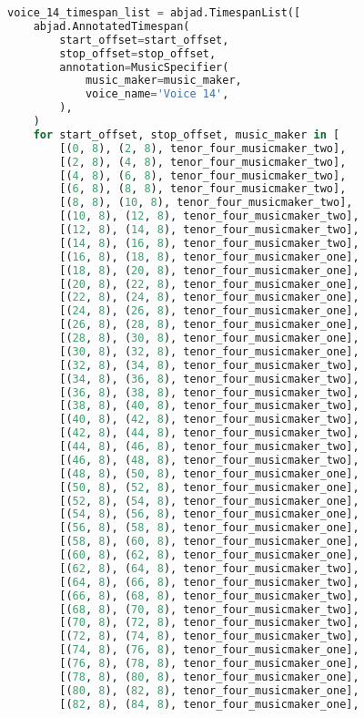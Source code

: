 \begin{lstlisting}[language=Python, caption=Invocation Source Code]
voice_14_timespan_list = abjad.TimespanList([
    abjad.AnnotatedTimespan(
        start_offset=start_offset,
        stop_offset=stop_offset,
        annotation=MusicSpecifier(
            music_maker=music_maker,
            voice_name='Voice 14',
        ),
    )
    for start_offset, stop_offset, music_maker in [
        [(0, 8), (2, 8), tenor_four_musicmaker_two],
        [(2, 8), (4, 8), tenor_four_musicmaker_two],
        [(4, 8), (6, 8), tenor_four_musicmaker_two],
        [(6, 8), (8, 8), tenor_four_musicmaker_two],
        [(8, 8), (10, 8), tenor_four_musicmaker_two],
        [(10, 8), (12, 8), tenor_four_musicmaker_two],
        [(12, 8), (14, 8), tenor_four_musicmaker_two],
        [(14, 8), (16, 8), tenor_four_musicmaker_two],
        [(16, 8), (18, 8), tenor_four_musicmaker_one],
        [(18, 8), (20, 8), tenor_four_musicmaker_one],
        [(20, 8), (22, 8), tenor_four_musicmaker_one],
        [(22, 8), (24, 8), tenor_four_musicmaker_one],
        [(24, 8), (26, 8), tenor_four_musicmaker_one],
        [(26, 8), (28, 8), tenor_four_musicmaker_one],
        [(28, 8), (30, 8), tenor_four_musicmaker_one],
        [(30, 8), (32, 8), tenor_four_musicmaker_one],
        [(32, 8), (34, 8), tenor_four_musicmaker_two],
        [(34, 8), (36, 8), tenor_four_musicmaker_two],
        [(36, 8), (38, 8), tenor_four_musicmaker_two],
        [(38, 8), (40, 8), tenor_four_musicmaker_two],
        [(40, 8), (42, 8), tenor_four_musicmaker_two],
        [(42, 8), (44, 8), tenor_four_musicmaker_two],
        [(44, 8), (46, 8), tenor_four_musicmaker_two],
        [(46, 8), (48, 8), tenor_four_musicmaker_two],
        [(48, 8), (50, 8), tenor_four_musicmaker_one],
        [(50, 8), (52, 8), tenor_four_musicmaker_one],
        [(52, 8), (54, 8), tenor_four_musicmaker_one],
        [(54, 8), (56, 8), tenor_four_musicmaker_one],
        [(56, 8), (58, 8), tenor_four_musicmaker_one],
        [(58, 8), (60, 8), tenor_four_musicmaker_one],
        [(60, 8), (62, 8), tenor_four_musicmaker_one],
        [(62, 8), (64, 8), tenor_four_musicmaker_two],
        [(64, 8), (66, 8), tenor_four_musicmaker_two],
        [(66, 8), (68, 8), tenor_four_musicmaker_two],
        [(68, 8), (70, 8), tenor_four_musicmaker_two],
        [(70, 8), (72, 8), tenor_four_musicmaker_two],
        [(72, 8), (74, 8), tenor_four_musicmaker_two],
        [(74, 8), (76, 8), tenor_four_musicmaker_one],
        [(76, 8), (78, 8), tenor_four_musicmaker_one],
        [(78, 8), (80, 8), tenor_four_musicmaker_one],
        [(80, 8), (82, 8), tenor_four_musicmaker_one],
        [(82, 8), (84, 8), tenor_four_musicmaker_one],

\end{lstlisting}

